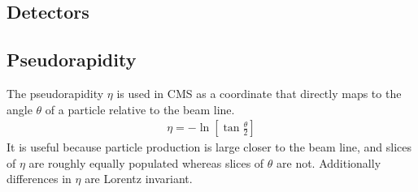 \subsection{Detectors}



\subsection{Pseudorapidity}
The pseudorapidity $\eta$ is used in CMS as a coordinate that directly maps to the angle $\theta$ of a particle relative to the beam line.
\begin{align}
\eta = -\ln\left[\tan\frac{\theta}{2}\right]
\end{align}
It is useful because particle production is large closer to the beam line, and slices of $\eta$ are roughly equally populated whereas slices of $\theta$ are not. Additionally differences in $\eta$ are Lorentz invariant.
